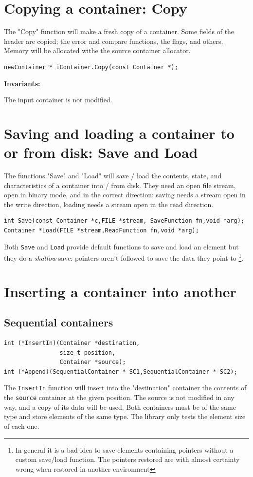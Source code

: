 \documentclass[12pt,a4paper]{memoir} %
\newcommand{\Const}{
{\par\noindent \textbf{Invariants:}\noindent}
}
\begin{document}
\section{Copying a container: Copy}
\noindent The "Copy" function will make a fresh copy of a container. Some fields of the header are copied: the error and compare functions, the flags, and others. Memory will be allocated withe the source container allocator.
\begin{verbatim}
newContainer * iContainer.Copy(const Container *);
\end{verbatim}
\Const The input container is not modified.
\section{Saving and loading a container to or from disk: Save and Load}
The functions "Save" and "Load" will save / load the contents, state, and characteristics of a container into / from disk. They need an open file stream, open in binary mode, and in the correct direction: saving needs a stream open in the write direction, loading needs a stream open in the read direction.
\begin{verbatim}
int Save(const Container *c,FILE *stream, SaveFunction fn,void *arg);
Container *Load(FILE *stream,ReadFunction fn,void *arg);
\end{verbatim}
Both \texttt{Save} and \texttt{Load} provide default functions to save and load an element but they do a \textsl{shallow} save: pointers aren't followed 
to save the data they point to \footnote{In general it is a bad idea to save elements containing pointers without a custom save/load function. The 
pointers restored are with almost certainty wrong when restored in another environment}.
\section{Inserting a container into another}
\subsection{Sequential containers}
\noindent
\begin{verbatim}
int (*InsertIn)(Container *destination,
                size_t position,
                Container *source);
int (*Append)(SequentialContainer * SC1,SequentialContainer * SC2);
\end{verbatim}
The \texttt{InsertIn} function will insert into the "destination" container the contents of the \verb,source, container at the given position. The source is not modified in any way, and a copy of its data will be used. Both containers must be of the same type and store elements of  the same type. The library only tests the element size of each one.
\end{document}

